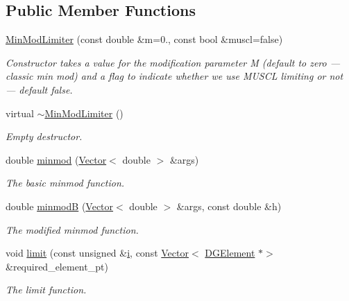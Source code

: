 \subsection*{Public Member Functions}
\begin{DoxyCompactItemize}
\item 
\hyperlink{classoomph_1_1MinModLimiter_a77bf95978408ce37d0da72d6c096a762}{Min\+Mod\+Limiter} (const double \&m=0., const bool \&muscl=false)
\begin{DoxyCompactList}\small\item\em Constructor takes a value for the modification parameter M (default to zero --- classic min mod) and a flag to indicate whether we use M\+U\+S\+CL limiting or not --- default false. \end{DoxyCompactList}\item 
virtual \hyperlink{classoomph_1_1MinModLimiter_aac8ae978f42ceddf1486702d84cf5b88}{$\sim$\+Min\+Mod\+Limiter} ()
\begin{DoxyCompactList}\small\item\em Empty destructor. \end{DoxyCompactList}\item 
double \hyperlink{classoomph_1_1MinModLimiter_a0c33f8903b7b06e79266e29a5c9cb087}{minmod} (\hyperlink{classoomph_1_1Vector}{Vector}$<$ double $>$ \&args)
\begin{DoxyCompactList}\small\item\em The basic minmod function. \end{DoxyCompactList}\item 
double \hyperlink{classoomph_1_1MinModLimiter_a5ae4780f5da176b517c1380e29f74e0b}{minmodB} (\hyperlink{classoomph_1_1Vector}{Vector}$<$ double $>$ \&args, const double \&h)
\begin{DoxyCompactList}\small\item\em The modified minmod function. \end{DoxyCompactList}\item 
void \hyperlink{classoomph_1_1MinModLimiter_a95858e125f3ce738f6591caf7827ee4d}{limit} (const unsigned \&\hyperlink{cfortran_8h_adb50e893b86b3e55e751a42eab3cba82}{i}, const \hyperlink{classoomph_1_1Vector}{Vector}$<$ \hyperlink{classoomph_1_1DGElement}{D\+G\+Element} $\ast$$>$ \&required\+\_\+element\+\_\+pt)
\begin{DoxyCompactList}\small\item\em The limit function. \end{DoxyCompactList}\end{DoxyCompactItemize}
